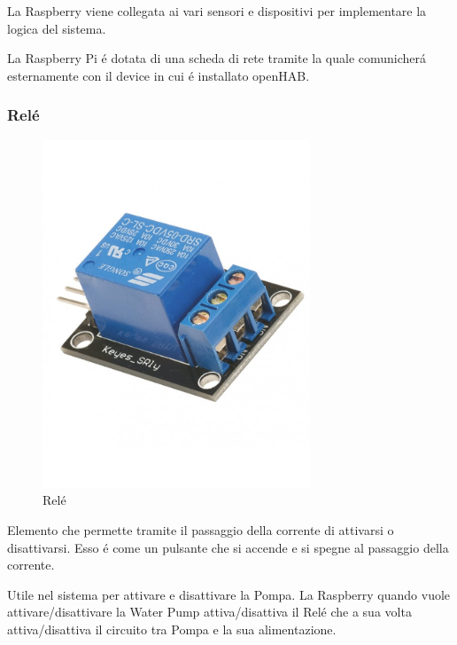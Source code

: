 La Raspberry viene collegata ai vari sensori e dispositivi per implementare la logica del sistema.

La Raspberry Pi \'e dotata di una scheda di rete tramite la quale comunicher\'a esternamente con il device in cui \'e installato openHAB.

\subsubsection{Rel\'e}
\begin{figure}
    \centering
    \includegraphics[width=8cm]{Immagini/rele}
    \caption{Rel\'e}
    \label{fig:rele}
\end{figure}
Elemento che permette tramite il passaggio della corrente di attivarsi o disattivarsi. Esso \'e come un pulsante che si accende e si spegne al passaggio della corrente.

Utile nel sistema per attivare e disattivare la Pompa. La Raspberry quando vuole attivare/disattivare la Water Pump attiva/disattiva il Rel\'e che a sua volta attiva/disattiva il circuito tra Pompa e la sua alimentazione.

